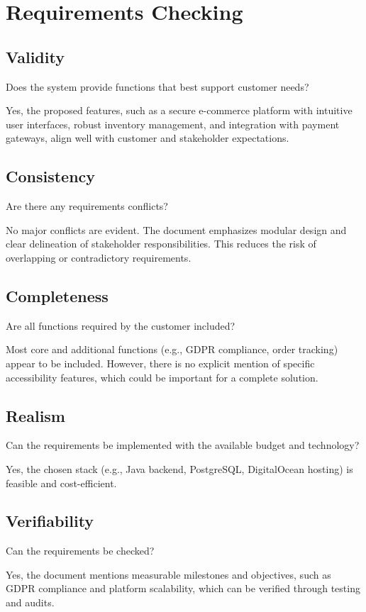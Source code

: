 \documentclass[a4paper,journal]{IEEEtran}
\begin{document}
\section{Requirements Checking}
\subsection{Validity}
\begin{displayquote}
  Does the system provide functions that best support customer needs?
\end{displayquote}
Yes, the proposed features, such as a secure e-commerce platform with intuitive
user interfaces, robust inventory management, and integration with payment
gateways, align well with customer and stakeholder expectations.

\subsection{Consistency}
\begin{displayquote}
  Are there any requirements conflicts?
\end{displayquote}
No major conflicts are evident.
The document emphasizes modular design and clear delineation of stakeholder
responsibilities.
This reduces the risk of overlapping or contradictory requirements.

\subsection{Completeness}
\begin{displayquote}
  Are all functions required by the customer included?
\end{displayquote}
Most core and additional functions (e.g., GDPR compliance, order tracking)
appear to be included.
However, there is no explicit mention of specific accessibility features, which
could be important for a complete solution.

\subsection{Realism}
\begin{displayquote}
  Can the requirements be implemented with the available budget and technology?
\end{displayquote}
Yes, the chosen stack (e.g., Java backend, PostgreSQL, DigitalOcean hosting) is
feasible and cost-efficient.

\subsection{Verifiability}
\begin{displayquote}
  Can the requirements be checked?
\end{displayquote}
Yes, the document mentions measurable milestones and objectives, such as GDPR
compliance and platform scalability, which can be verified through testing and
audits.
\end{document}
